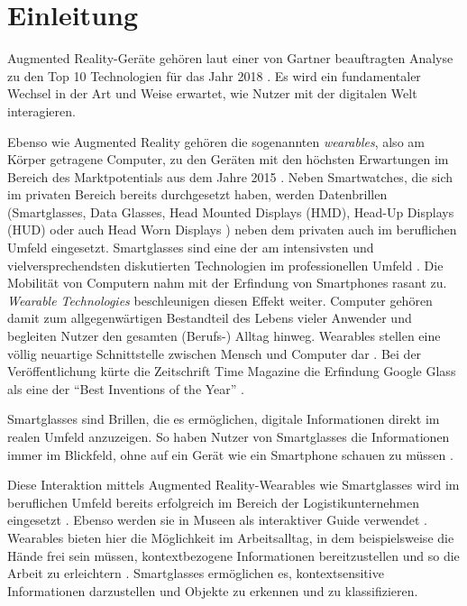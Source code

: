 %
%
%
%
%
%
\chapter{Einleitung}
\label{ch:Einleitung}
Augmented Reality-Geräte gehören laut einer von Gartner beauftragten Analyse \cite{Linden2003} zu den Top 10 Technologien für das Jahr 2018 \cite{Panetta2017a}. Es wird ein fundamentaler Wechsel in der Art und Weise erwartet, wie Nutzer mit der digitalen Welt interagieren. 

Ebenso wie Augmented Reality gehören die sogenannten \emph{wearables}, also am Körper getragene Computer, zu den Geräten mit den höchsten Erwartungen im Bereich des Marktpotentials aus dem Jahre 2015 \cite{Levy2015}. Neben Smartwatches, die sich im privaten Bereich bereits durchgesetzt haben, werden Datenbrillen (Smartglasses, Data Glasses, Head Mounted Displays (HMD), Head-Up Displays (HUD) oder auch Head Worn Displays \cite{Zobel2016}) neben dem privaten auch im beruflichen Umfeld eingesetzt. Smartglasses sind eine der am intensivsten und vielversprechendsten diskutierten Technologien im professionellen Umfeld \cite{Hein2016}. Die Mobilität von Computern nahm mit der Erfindung von Smartphones rasant zu. \emph{Wearable Technologies} beschleunigen diesen Effekt weiter. Computer gehören damit zum allgegenwärtigen Bestandteil des Lebens vieler Anwender und begleiten Nutzer den gesamten (Berufs-) Alltag hinweg. Wearables stellen eine völlig neuartige Schnittstelle zwischen Mensch und Computer dar \cite[S.~25f]{Schwenke2016}. Bei der Veröffentlichung kürte die Zeitschrift Time Magazine die Erfindung Google Glass als eine der \enquote{Best Inventions of the Year} \cite{Bilton2015}.

Smartglasses sind Brillen, die es ermöglichen, digitale Informationen direkt im realen Umfeld anzuzeigen. So haben Nutzer von Smartglasses die Informationen immer im Blickfeld, ohne auf ein Gerät wie ein Smartphone schauen zu müssen \cite{Due2014Glasses}.

Diese Interaktion mittels Augmented Reality-Wearables wie Smartglasses wird im beruflichen Umfeld bereits erfolgreich im Bereich der Logistikunternehmen eingesetzt \cite{Plutz}.
Ebenso werden sie in Museen als interaktiver Guide verwendet \cite{Hein2016}. 
Wearables bieten hier die Möglichkeit im Arbeitsalltag, in dem beispielsweise die Hände frei sein müssen, kontextbezogene Informationen bereitzustellen und so die Arbeit zu erleichtern \cite{Zobel2016}. Smartglasses ermöglichen es, kontextsensitive Informationen darzustellen und Objekte zu erkennen und zu klassifizieren.
%

